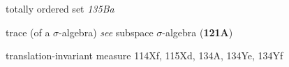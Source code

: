 totally ordered set {\it 135Ba}










{trace }
(of a $\sigma$-algebra) {\it see} subspace $\sigma$-algebra ({\bf 121A})





















{translation-invariant }
measure 114Xf, 115Xd, 134A, 134Ye, 134Yf













































\indexmedskip























